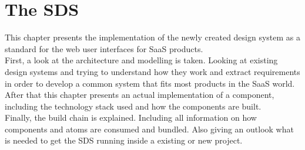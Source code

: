 \newpage
\section{The \ac*{SDS}}
This chapter presents the implementation of the newly created design system as a standard for the web user interfaces for SaaS products. \\
First, a look at the architecture and modelling is taken. Looking at existing design systems and trying to understand  how they work and extract requirements in order to develop a common system that fits most products in the SaaS world. \\
After that this chapter presents an actual implementation of a component, including the technology stack used and how the components are built. \\
Finally, the build chain is explained. Including all information on how components and atoms are consumed and bundled. Also giving an outlook what is needed to get the SDS running inside a existing or new project.


